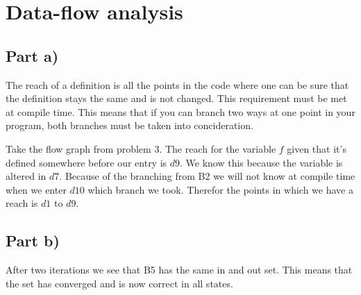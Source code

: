 \documentclass[paper=a4, fontsize=11pt]{scrartcl} %
\numberwithin{equation}{section} %
\numberwithin{figure}{section} %
\numberwithin{table}{section} %
\begin{document}
\section{Data-flow analysis}

\subsection{Part a)}
The reach of a definition is all the points in the code where one can be sure that the definition stays the same and is not changed.
This requirement must be met at compile time.
This means that if you can branch two ways at one point in your program, both branches must be taken into concideration.

Take the flow graph from problem 3.
The reach for the variable $f$ given that it's defined somewhere before our entry is $d9$.
We know this because the variable is altered in $d7$.
Because of the branching from B2 we will not know at compile time when we enter $d10$ which branch we took.
Therefor the points in which we have a reach is $d1$ to $d9$.

\newpage
\subsection{Part b)}
After two iterations we see that B5 has the same in and out set.
This means that the set has converged and is now correct in all states.
\end{document}
